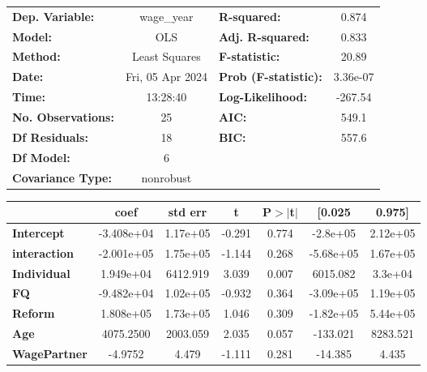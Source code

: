 \begin{center}
    \begin{tabular}{lclc}
    \toprule
    \textbf{Dep. Variable:}    &    wage\_year    & \textbf{  R-squared:         } &    0.874  \\
    \textbf{Model:}            &       OLS        & \textbf{  Adj. R-squared:    } &    0.833  \\
    \textbf{Method:}           &  Least Squares   & \textbf{  F-statistic:       } &    20.89  \\
    \textbf{Date:}             & Fri, 05 Apr 2024 & \textbf{  Prob (F-statistic):} & 3.36e-07  \\
    \textbf{Time:}             &     13:28:40     & \textbf{  Log-Likelihood:    } &  -267.54  \\
    \textbf{No. Observations:} &          25      & \textbf{  AIC:               } &    549.1  \\
    \textbf{Df Residuals:}     &          18      & \textbf{  BIC:               } &    557.6  \\
    \textbf{Df Model:}         &           6      & \textbf{                     } &           \\
    \textbf{Covariance Type:}  &    nonrobust     & \textbf{                     } &           \\
    \bottomrule
    \end{tabular}
    \end{center}
    \begin{center}
    \begin{tabular}{lcccccc}
    \toprule
                         & \textbf{coef} & \textbf{std err} & \textbf{t} & \textbf{P$> |$t$|$} & \textbf{[0.025} & \textbf{0.975]}  \\
    \midrule
    \textbf{Intercept}   &   -3.408e+04  &     1.17e+05     &    -0.291  &         0.774        &     -2.8e+05    &     2.12e+05     \\
    \textbf{interaction} &   -2.001e+05  &     1.75e+05     &    -1.144  &         0.268        &    -5.68e+05    &     1.67e+05     \\
    \textbf{Individual}  &    1.949e+04  &     6412.919     &     3.039  &         0.007        &     6015.082    &      3.3e+04     \\
    \textbf{FQ}          &   -9.482e+04  &     1.02e+05     &    -0.932  &         0.364        &    -3.09e+05    &     1.19e+05     \\
    \textbf{Reform}      &    1.808e+05  &     1.73e+05     &     1.046  &         0.309        &    -1.82e+05    &     5.44e+05     \\
    \textbf{Age}         &    4075.2500  &     2003.059     &     2.035  &         0.057        &     -133.021    &     8283.521     \\
    \textbf{WagePartner} &      -4.9752  &        4.479     &    -1.111  &         0.281        &      -14.385    &        4.435     \\
    \bottomrule
    \end{tabular}
    \end{center}
